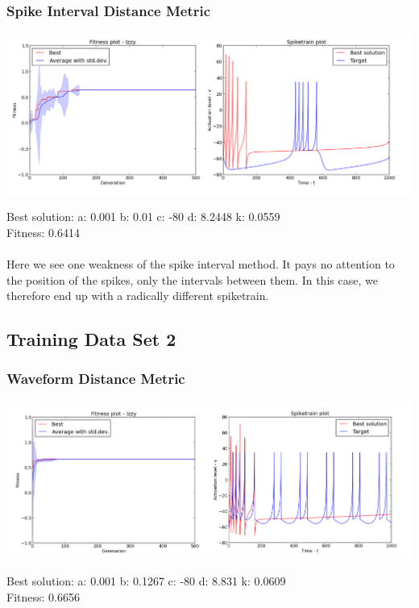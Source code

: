 \documentclass[a4paper,12pt]{article}
\begin{document}
\subsubsection{Spike Interval Distance Metric}
\centerline{\includegraphics[width=1.3\textwidth]{img/case1_int}}
Best solution: 
a: 0.001 
b: 0.01 
c: -80 
d: 8.2448 
k: 0.0559 \\
Fitness: 0.6414
\paragraph{}Here we see one weakness of the spike interval method. It pays no attention to the position of the spikes, only the intervals between them. In this case, we therefore end up with a radically different spiketrain.

\subsection{Training Data Set 2}
\subsubsection{Waveform Distance Metric}
\centerline{\includegraphics[width=1.3\textwidth]{img/case2_wave}}
Best solution: 
a: 0.001 
b: 0.1267 
c: -80 
d: 8.831 
k: 0.0609 \\
Fitness: 0.6656
\end{document}
